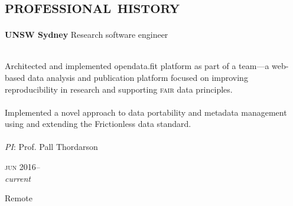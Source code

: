 
\vspace{-0.6cm}
\section*{\textsc{professional history}}
\vspace{-0.2cm}


\begin{minipage}[t]{\mainboxwidth\textwidth}
\textbf{UNSW Sydney}\phantom{..} Research software engineer\\
{\small
\\
Architected and implemented opendata.fit platform as part of a team—a web-based data analysis and publication platform focused on improving reproducibility in research and supporting \textsc{fair} data principles.\\
\\
Implemented a novel approach to data portability and metadata management using and extending the Frictionless data standard.\\
\\
\textit{PI}: Prof. Pall Thordarson\\

\par}
\end{minipage}
\begin{minipage}[t]{\detailboxwidth\textwidth}
{
\hfill \textsc{jun} 2016--\\ 
\hspace*{0pt} \hfill \textit{current}
\par
{\small\hfill Remote}
}
\end{minipage}
\\


